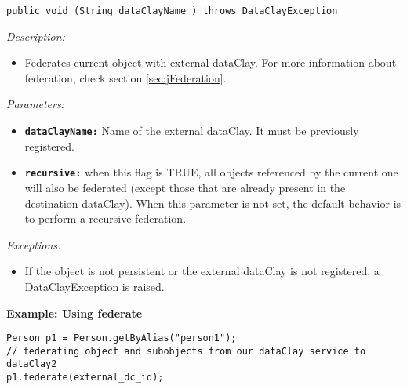 \begin{dBox}

\texttt{public void (String dataClayName ) throws DataClayException}
\LINE

{\it Description:}

\begin{itemize}
  \item Federates current object with external dataClay. For more information about federation, check section \ref{sec:jFederation}.
\end{itemize}

{\it Parameters:}

\begin{itemize}
  \item \texttt{\bfseries dataClayName:} Name of the external dataClay. It must be previously registered.
  \item \texttt{\bfseries recursive:} when this flag is TRUE, all objects referenced by the current one will also be federated (except those that are already present in the destination dataClay). When this parameter is not set, the default behavior is to perform a recursive federation.
\end{itemize}

{\it Exceptions:}

\begin{itemize}
  \item If the object is not persistent or the external dataClay is not registered, a DataClayException is raised.

\end{itemize}

\end{dBox}

\begin{tBox}
\textcolor{basecolor} {\bf Example: Using federate}
\begin{lstlisting}
Person p1 = Person.getByAlias("person1");
// federating object and subobjects from our dataClay service to dataClay2
p1.federate(external_dc_id);
\end{lstlisting}
\end{tBox}


